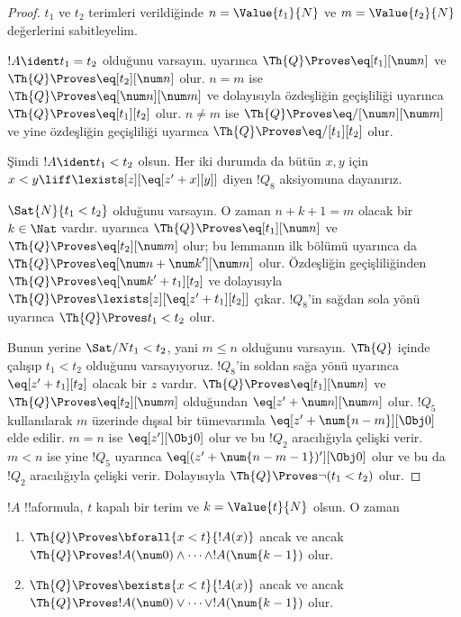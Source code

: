 \documentclass[../../../include/open-logic-section]{subfiles}
\begin{document}
\begin{proof}
$t_1$ ve $t_2$ terimleri verildiğinde $n=\Value{t_1}{N}$ ve
$m=\Value{t_2}{N}$ değerlerini sabitleyelim.

$!A\ident t_1=t_2$ olduğunu varsayın. 
uyarınca $\Th{Q} \Proves \eq[t_1][\num n]$ ve
$\Th{Q} \Proves \eq[t_2][\num n]$ olur. $n=m$ ise
$\Th{Q} \Proves \eq[\num n][\num m]$ ve dolayısıyla özdeşliğin geçişliliği
uyarınca $\Th{Q} \Proves \eq[t_1][t_2]$ olur. $n\neq m$ ise
$\Th{Q} \Proves \eq/[\num n][\num m]$ ve yine özdeşliğin geçişliliği
uyarınca $\Th{Q} \Proves \eq/[t_1][t_2]$ olur.

Şimdi $!A\ident t_1<t_2$ olsun. Her iki durumda da bütün $x,y$ için
$x<y\liff\lexists[z][\eq[z'+x][y]]$ diyen $!Q_8$ aksiyomuna dayanırız.

$\Sat{N}{t_1<t_2}$ olduğunu varsayın. O zaman $n+k+1=m$ olacak bir
$k\in\Nat$ vardır.  uyarınca
$\Th{Q} \Proves \eq[t_1][\num n]$ ve
$\Th{Q} \Proves \eq[t_2][\num m]$ olur; bu lemmanın ilk bölümü uyarınca da
$\Th{Q} \Proves \eq[\num n+{\num k}'][\num m]$ olur. Özdeşliğin
geçişliliğinden $\Th{Q} \Proves \eq[{\num k}'+t_1][t_2]$ ve dolayısıyla
$\Th{Q} \Proves \lexists[z][\eq[z'+t_1][t_2]]$ çıkar. $!Q_8$'in sağdan
sola yönü uyarınca $\Th{Q} \Proves t_1<t_2$ olur.

Bunun yerine $\Sat/{N}{t_1<t_2}$, yani $m\leq n$ olduğunu varsayın.
%
$\Th{Q}$ içinde çalışıp $t_1<t_2$ olduğunu varsayıyoruz. $!Q_8$'in soldan
sağa yönü uyarınca $\eq[z'+t_1][t_2]$ olacak bir $z$ vardır.
$\Th{Q} \Proves \eq[t_1][\num n]$ ve
$\Th{Q} \Proves \eq[t_2][\num m]$ olduğundan
$\eq[z'+\num n][\num m]$ olur.
%
$!Q_5$ kullanılarak $m$ üzerinde dışsal bir tümevarımla
$\eq[z'+\num{n-m}][\Obj 0]$ elde edilir.
$m=n$ ise $\eq[z'][\Obj 0]$ olur ve bu $!Q_2$ aracılığıyla çelişki verir.
$m<n$ ise yine $!Q_5$ uyarınca
$\eq[(z'+\num{n-m-1})'][\Obj 0]$ olur ve bu da $!Q_2$ aracılığıyla çelişki
verir. Dolayısıyla $\Th{Q} \Proves \lnot(t_1<t_2)$ olur.
\end{proof}

\begin{lem}
$!A$ !!a{formula}, $t$ kapalı bir terim ve $k=\Value{t}{N}$ olsun. O zaman
\begin{enumerate}
\item $\Th{Q} \Proves \bforall{x<t}{!A(x)}$ ancak ve ancak $\Th{Q} \Proves
    !A(\num 0) \land \dots \land !A(\num{k-1})$ olur.
\item $\Th{Q} \Proves \bexists{x<t}{!A(x)}$ ancak ve ancak $\Th{Q} \Proves
    !A(\num 0) \lor \dots \lor !A(\num{k-1})$ olur.
\end{enumerate}
\end{lem}
\end{document}
